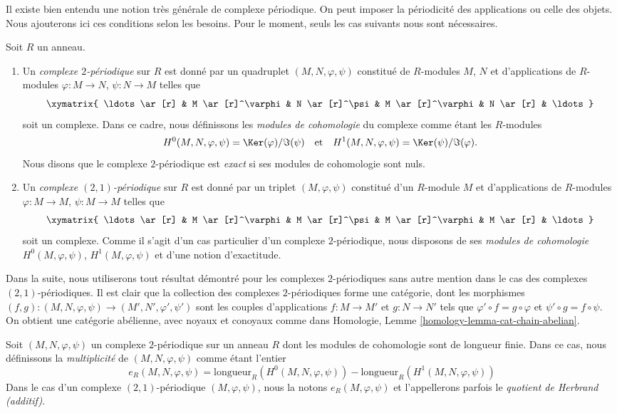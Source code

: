 \noindent
Il existe bien entendu une notion très générale de complexe périodique.
On peut imposer la périodicité des applications ou celle des objets.
Nous ajouterons ici ces conditions selon les besoins. Pour le moment, seuls les
cas suivants nous sont nécessaires.

\begin{definition}
\label{definition-periodic-complex}
Soit $R$ un anneau.
\begin{enumerate}
\item Un {\it complexe $2$-périodique} sur $R$ est donné
par un quadruplet $(M, N, \varphi, \psi)$ constitué de
$R$-modules $M$, $N$ et d'applications de $R$-modules $\varphi : M \to N$,
$\psi : N \to M$ telles que
$$
\xymatrix{
\ldots \ar[r] &
M \ar[r]^\varphi &
N \ar[r]^\psi &
M \ar[r]^\varphi &
N \ar[r] & \ldots
}
$$
soit un complexe. Dans ce cadre, nous définissons les {\it modules de cohomologie}
du complexe comme étant les $R$-modules
$$
H^0(M, N, \varphi, \psi) = \Ker(\varphi)/\Im(\psi)
\quad\text{et}\quad
H^1(M, N, \varphi, \psi) = \Ker(\psi)/\Im(\varphi).
$$
Nous disons que le complexe $2$-périodique est {\it exact} si ses modules de cohomologie
sont nuls.
\item Un {\it complexe $(2, 1)$-périodique} sur $R$ est donné
par un triplet $(M, \varphi, \psi)$ constitué d'un $R$-module $M$ et
d'applications de $R$-modules $\varphi : M \to M$, $\psi : M \to M$
telles que
$$
\xymatrix{
\ldots \ar[r] &
M \ar[r]^\varphi &
M \ar[r]^\psi &
M \ar[r]^\varphi &
M \ar[r] & \ldots
}
$$
soit un complexe. Comme il s'agit d'un cas particulier d'un complexe $2$-périodique,
nous disposons de ses {\it modules de cohomologie} $H^0(M, \varphi, \psi)$,
$H^1(M, \varphi, \psi)$ et d'une notion d'exactitude.
\end{enumerate}
\end{definition}

\noindent
Dans la suite, nous utiliserons tout résultat démontré pour les complexes $2$-périodiques
sans autre mention dans le cas des complexes $(2, 1)$-périodiques.
Il est clair que la collection des complexes $2$-périodiques forme une
catégorie, dont les morphismes
$(f, g) : (M, N, \varphi, \psi) \to (M', N', \varphi', \psi')$
sont les couples d'applications $f : M \to M'$ et $g : N \to N'$ tels
que $\varphi' \circ f = g \circ \varphi$ et $\psi' \circ g = f \circ \psi$.
On obtient une catégorie abélienne, avec noyaux et conoyaux comme dans
Homologie, Lemme \ref{homology-lemma-cat-chain-abelian}.

\begin{definition}
\label{definition-periodic-length}
Soit $(M, N, \varphi, \psi)$ un complexe $2$-périodique
sur un anneau $R$ dont les modules de cohomologie sont de longueur finie.
Dans ce cas, nous définissons la {\it multiplicité} de $(M, N, \varphi, \psi)$
comme étant l'entier
$$
e_R(M, N, \varphi, \psi) =
\text{longueur}_R(H^0(M, N, \varphi, \psi))
-
\text{longueur}_R(H^1(M, N, \varphi, \psi))
$$
Dans le cas d'un complexe $(2, 1)$-périodique $(M, \varphi, \psi)$,
nous la notons $e_R(M, \varphi, \psi)$ et l'appellerons parfois
le {\it quotient de Herbrand (additif)}.
\end{definition}

